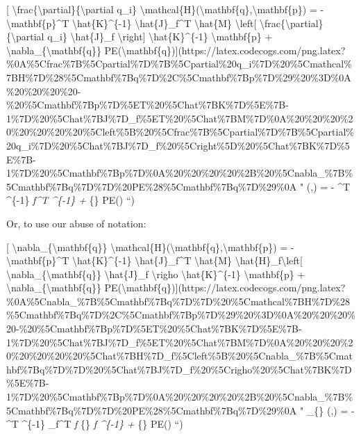 \documentclass[]{article}
\begin{document}
{[} \textbackslash{}frac\{\textbackslash{}partial\}\{\textbackslash{}partial
q\_i\}
\textbackslash{}mathcal\{H\}(\textbackslash{}mathbf\{q\},\textbackslash{}mathbf\{p\})
= - \textbackslash{}mathbf\{p\}\^{}T \textbackslash{}hat\{K\}\^{}\{-1\}
\textbackslash{}hat\{J\}\_f\^{}T \textbackslash{}hat\{M\}
\textbackslash{}left{[}
\textbackslash{}frac\{\textbackslash{}partial\}\{\textbackslash{}partial q\_i\}
\textbackslash{}hat\{J\}\_f \textbackslash{}right{]}
\textbackslash{}hat\{K\}\^{}\{-1\} \textbackslash{}mathbf\{p\} +
\textbackslash{}nabla\_\{\textbackslash{}mathbf\{q\}\}
PE(\textbackslash{}mathbf\{q\}){]}(https://latex.codecogs.com/png.latex?\%0A\%5Cfrac\%7B\%5Cpartial\%7D\%7B\%5Cpartial\%20q\_i\%7D\%20\%5Cmathcal\%7BH\%7D\%28\%5Cmathbf\%7Bq\%7D\%2C\%5Cmathbf\%7Bp\%7D\%29\%20\%3D\%0A\%20\%20\%20\%20-\%20\%5Cmathbf\%7Bp\%7D\%5ET\%20\%5Chat\%7BK\%7D\%5E\%7B-1\%7D\%20\%5Chat\%7BJ\%7D\_f\%5ET\%20\%5Chat\%7BM\%7D\%0A\%20\%20\%20\%20\%20\%20\%20\%20\%5Cleft\%5B\%20\%5Cfrac\%7B\%5Cpartial\%7D\%7B\%5Cpartial\%20q\_i\%7D\%20\%5Chat\%7BJ\%7D\_f\%20\%5Cright\%5D\%20\%5Chat\%7BK\%7D\%5E\%7B-1\%7D\%20\%5Cmathbf\%7Bp\%7D\%0A\%20\%20\%20\%20\%2B\%20\%5Cnabla\_\%7B\%5Cmathbf\%7Bq\%7D\%7D\%20PE\%28\%5Cmathbf\%7Bq\%7D\%29\%0A
"  (,) = -
\^{}T \^{}\{-1\} \emph{f\^{}T 
 \^{}\{-1\}
 + \nabla}\{\} PE() ``)

Or, to use our abuse of notation:

{[} \textbackslash{}nabla\_\{\textbackslash{}mathbf\{q\}\}
\textbackslash{}mathcal\{H\}(\textbackslash{}mathbf\{q\},\textbackslash{}mathbf\{p\})
= - \textbackslash{}mathbf\{p\}\^{}T \textbackslash{}hat\{K\}\^{}\{-1\}
\textbackslash{}hat\{J\}\_f\^{}T \textbackslash{}hat\{M\}
\textbackslash{}hat\{H\}\_f\textbackslash{}left{[}
\textbackslash{}nabla\_\{\textbackslash{}mathbf\{q\}\}
\textbackslash{}hat\{J\}\_f \textbackslash{}righo
\textbackslash{}hat\{K\}\^{}\{-1\} \textbackslash{}mathbf\{p\} +
\textbackslash{}nabla\_\{\textbackslash{}mathbf\{q\}\}
PE(\textbackslash{}mathbf\{q\}){]}(https://latex.codecogs.com/png.latex?\%0A\%5Cnabla\_\%7B\%5Cmathbf\%7Bq\%7D\%7D\%20\%5Cmathcal\%7BH\%7D\%28\%5Cmathbf\%7Bq\%7D\%2C\%5Cmathbf\%7Bp\%7D\%29\%20\%3D\%0A\%20\%20\%20\%20-\%20\%5Cmathbf\%7Bp\%7D\%5ET\%20\%5Chat\%7BK\%7D\%5E\%7B-1\%7D\%20\%5Chat\%7BJ\%7D\_f\%5ET\%20\%5Chat\%7BM\%7D\%0A\%20\%20\%20\%20\%20\%20\%20\%20\%5Chat\%7BH\%7D\_f\%5Cleft\%5B\%20\%5Cnabla\_\%7B\%5Cmathbf\%7Bq\%7D\%7D\%20\%5Chat\%7BJ\%7D\_f\%20\%5Crigho\%20\%5Chat\%7BK\%7D\%5E\%7B-1\%7D\%20\%5Cmathbf\%7Bp\%7D\%0A\%20\%20\%20\%20\%2B\%20\%5Cnabla\_\%7B\%5Cmathbf\%7Bq\%7D\%7D\%20PE\%28\%5Cmathbf\%7Bq\%7D\%29\%0A
" \nabla\_\{\} (,) = - \^{}T
\^{}\{-1\} \_f\^{}T  \emph{f\left{[}
\nabla}\{\} \emph{f \righo {}\^{}\{-1\}  +
\nabla}\{\} PE() ``)
\end{document}
